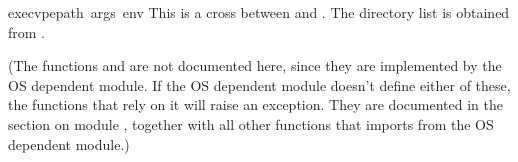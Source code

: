 \begin{funcdesc}{execvpe}{path\, args\, env}
This is a cross between  and .
The directory list is obtained from .
\end{funcdesc}

(The functions  and  are not
documented here, since they are implemented by the OS dependent
module.  If the OS dependent module doesn't define either of these,
the functions that rely on it will raise an exception.  They are
documented in the section on module , together with all
other functions that  imports from the OS dependent module.)
